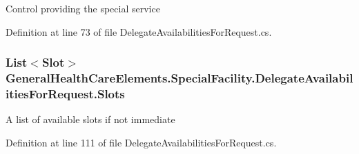 Control providing the special service 



Definition at line 73 of file Delegate\+Availabilities\+For\+Request.\+cs.

\subsubsection[{\texorpdfstring{Slots}{Slots}}]{\setlength{\rightskip}{0pt plus 5cm}List$<${\bf Slot}$>$ General\+Health\+Care\+Elements.\+Special\+Facility.\+Delegate\+Availabilities\+For\+Request.\+Slots\hspace{0.3cm}{\ttfamily [get]}}\hypertarget{class_general_health_care_elements_1_1_special_facility_1_1_delegate_availabilities_for_request_ab8365cc2b152e220f4bcac76274bcb9e}{}\label{class_general_health_care_elements_1_1_special_facility_1_1_delegate_availabilities_for_request_ab8365cc2b152e220f4bcac76274bcb9e}


A list of available slots if not immediate 



Definition at line 111 of file Delegate\+Availabilities\+For\+Request.\+cs.


